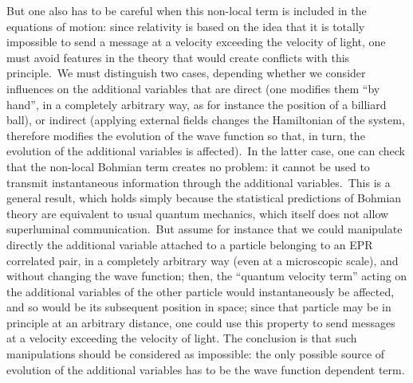 \documentclass[12pt,onecolumn]{article}%
\begin{document}
But one also has to be careful when this non-local term is included in the
equations of motion: since relativity is based on the idea that it is totally
impossible to send a message at a velocity exceeding the velocity of light,
one must avoid features in the theory that would create conflicts with this
principle.\ We must distinguish two cases, depending whether we consider
influences on the additional variables that are direct (one modifies them ``by
hand'', in a completely arbitrary way, as for instance the position of a
billiard ball), or indirect (applying external fields changes the Hamiltonian
of the system, therefore modifies the evolution of the wave function so that,
in turn, the evolution of the additional variables is affected).\ In the
latter case, one can check that the non-local Bohmian term creates no problem:
it cannot be used to transmit instantaneous information through the additional
variables.\ This is a general result, which holds simply because the
statistical predictions of Bohmian theory are equivalent to usual quantum
mechanics, which itself does not allow superluminal communication.\ But assume
for instance that we could manipulate directly the additional variable
attached to a particle belonging to an EPR correlated pair, in a completely
arbitrary way (even at a microscopic scale), and without changing the wave
function; then, the ``quantum velocity term'' acting on the additional
variables of the other particle would instantaneously be affected, and so
would be its subsequent position in space; since that particle may be in
principle at an arbitrary distance, one could use this property to send
messages at a velocity exceeding the velocity of light. The conclusion is that
such manipulations should be considered as impossible: the only possible
source of evolution of the additional variables has to be the wave function
dependent term.
\end{document}
